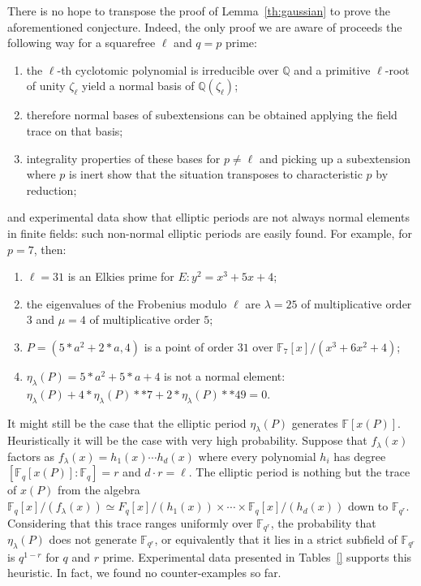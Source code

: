 \documentclass[12pt]{article}
\theoremstyle{plain}
\theoremstyle{definition}
\def\Q{\ensuremath{\mathbb{Q}}}
\def\F{\ensuremath{\mathbb{F}}}
\begin{document}
There is no hope to transpose the proof of Lemma~\ref{th:gaussian} to
prove the aforementioned conjecture.
Indeed, the only proof we are aware of proceeds the following way for
a squarefree $\ell$ and $q = p$ prime:
\begin{enumerate}
\item the $\ell$-th cyclotomic polynomial is irreducible over $\Q$ and
a primitive $\ell$-root of unity $\zeta_\ell$ yield a normal basis
of $\Q(\zeta_\ell)$;
\item therefore normal bases of subextensions can be obtained applying the field trace
on that basis;
\item integrality properties of these bases for $p \neq \ell$
and picking up a subextension where $p$ is inert show that
the situation transposes to characteristic $p$ by reduction;
\end{enumerate}
and experimental data show that elliptic periods are not always normal elements
in finite fields: such non-normal elliptic periods are easily found.
For example, for $p = 7$, then:
\begin{enumerate}
\item $\ell = 31$ is an Elkies prime for $E: y^2 = x^3 + 5 x + 4$;
\item the eigenvalues of the Frobenius modulo $\ell$ are $\lambda = 25$ of
multiplicative order $3$ and $\mu = 4$ of multiplicative order $5$;
\item $P = (5*a^2+2*a, 4)$ is a point of order $31$ over $\F_7[x]/(x^3 + 6 x^2 + 4)$;
\item $\eta_\lambda(P) = 5*a^2 + 5*a + 4$ is not a normal element:
$\eta_\lambda(P) + 4*\eta_\lambda(P)**7 + 2*\eta_\lambda(P)**49 = 0$.
\end{enumerate}

It might still be the case that the elliptic period $\eta_\lambda(P)$
generates $\F[x(P)]$.
Heuristically it will be the case with very high probability.
Suppose that $f_\lambda(x)$ factors as $f_\lambda(x) = h_1(x) \cdots h_d(x)$
where every polynomial $h_i$ has degree $[\F_q[x(P)] : \F_q] = r$
and $d \cdot r = \ell$.
The elliptic period is nothing but the trace of $x(P)$ from the algebra
$\F_q[x] / (f_\lambda(x)) \simeq F_q[x]/(h_1(x)) \times \cdots \times \F_q[x]/(h_d(x))$
down to $\F_{q^r}$.
Considering that this trace ranges uniformly over $\F_{q^r}$, the probability that
$\eta_\lambda(P)$ does not generate $\F_{q^r}$, or equivalently that it lies in
a strict subfield of $\F_{q^r}$ is $q^{1-r}$ for $q$ and $r$ prime.
Experimental data presented in Tables~\ref{} supports this heuristic.
In fact, we found no counter-examples so far.
\end{document}
